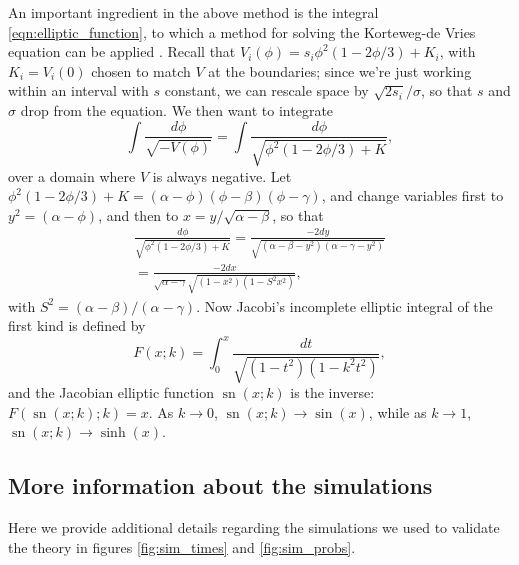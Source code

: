 \documentclass{article}
\newcommand{\citep}[1]{\cite{#1}}
\DeclareMathOperator{\sn}{sn}
\begin{document}
An important ingredient in the above method is the integral \eqref{eqn:elliptic_function},
to which a method for solving the Korteweg-de Vries equation can be applied \citep{NEQwiki}.
Recall that $V_i(\phi) =  s_i \phi^2(1-2\phi/3) + K_i$, with $K_i = V_i(0)$ chosen to match $V$ at the boundaries;
since we're just working within an interval with $s$ constant, we can rescale space by $\sqrt{2 s_i}/\sigma$,
so that $s$ and $\sigma$ drop from the equation.
We then want to integrate
\[
    \int \frac{ d\phi }{ \sqrt{-V(\phi)} } = 
         \int \frac{ d\phi }{ \sqrt{ \phi^2 (1-2\phi/3) + K } } ,
\]
over a domain where $V$ is always negative.
Let $\phi^2(1-2\phi/3)+K = (\alpha-\phi)(\phi-\beta)(\phi-\gamma)$,
and change variables first to $y^2=(\alpha-\phi)$, 
and then to $x = y/\sqrt{\alpha-\beta}$, so that
\begin{align*}
    \frac{ d\phi }{ \sqrt{ \phi^2 (1-2\phi/3) + K } } 
        = \frac{ - 2 dy }{ \sqrt{ (\alpha-\beta-y^2) (\alpha-\gamma-y^2) } } \\
        = \frac{ - 2 dx }{ \sqrt{\alpha-\gamma} \sqrt{ (1-x^2) (1-S^2 x^2) } } ,
\end{align*}
with $S^2 = (\alpha-\beta)/(\alpha-\gamma)$.
Now Jacobi's incomplete elliptic integral of the first kind is defined by
\[
    F(x;k) = \int_0^x \frac{dt}{\sqrt{ (1-t^2)(1-k^2t^2) }} ,
\]
and the Jacobian elliptic function $\sn(x;k)$ is the inverse: $F(\sn(x;k);k) = x$.
As $k \to 0$, $\sn(x;k) \to \sin(x)$, while as $k \to 1$, $\sn(x;k) \to \sinh(x)$.



\subsection*{More information about the simulations}
\label{apx:parameter_tables}

Here we provide additional details regarding the simulations we used
to validate the theory in figures \ref{fig:sim_times} and \ref{fig:sim_probs}.

\end{document}
